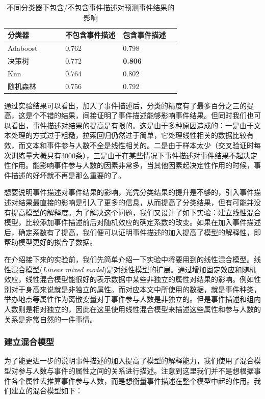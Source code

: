 \documentclass[12pt]{template}
\begin{document}
\begin{table}[htbp] 
  \centering
  \caption{\label{t1-3}不同分类器下包含/不包含事件描述对预测事件结果的影响}
  \begin{tabular*}{\linewidth}{p{0.33\linewidth}p{0.33\linewidth}p{0.33\linewidth}}
\toprule 
分类器&不包含事件描述&包含事件描述\\
\midrule
Adaboost & 0.762 & 0.798 \\
决策树& 0.772 & \textbf{0.806} \\
Knn & 0.764 & 0.802  \\
随机森林 & 0.756 & 0.792 \\
\bottomrule
  \end{tabular*}
\end{table}

通过实验结果可以看出，加入了事件描述后，分类的精度有了最多百分之三的提高，这是个不错的结果，间接证明了事件描述能够影响事件结果。但同时我们也可以看出，事件描述对结果的提高是有限的。这是由于多种原因造成的：一是由于文本处理的方式过于粗糙，拉索回归仍然过于简单，它处理线性相关的数据比较有效，而文本和事件参与人数不全是线性相关的。二是由于样本太少（交叉验证时每次训练量大概只有3000条），三是由于在某些情况下事件描述对事件结果不起决定性作用。能影响事件参与人数的因素非常多，当其他因素起决定性作用的时候，事件描述的好坏就不再是那么重要的了。

想要说明事件描述对事件结果的影响，光凭分类结果的提升是不够的，引入事件描述对结果最直接的影响是引入了更多的信息，从而提高了分类结果，但有可能并没有提高模型的解释度。为了解决这个问题，我们又设计了如下实验：建立线性混合模型，比较添加事件描述前后对随机效应的确定系数的改变。如果在加入事件描述后，确定系数有了提高，我们便可以证明事件描述的加入提高了模型的解释性，即帮助模型更好的拟合了数据。

在介绍接下来的实验前，我们先简单介绍一下实验中将要用到的线性混合模型。线性混合模型(\textit{Linear mixed model})是对线性模型的扩展。通过增加固定效应和随机效应，线性混合模型能很好的表示数据中某些非独立的属性对结果的影响。例如性别对于身高来说就是非独立的属性。而对应本文中所使用的数据，就是事件种类，举办地点等属性作为离散变量对于事件参与人数是非独立的。但是事件描述和组内人数则是相对独立的，因此在这里使用线性混合模型来描述这些属性和参与人数的关系是非常自然的一件事情。

\subsubsection{建立混合模型}

为了能更进一步的说明事件描述的加入提高了模型的解释能力，我们使用了混合模型对参与人数与事件的属性之间的关系进行描述。注意到这里我们并不是想根据事件各个属性去推算事件参与人数，而是想衡量事件描述在整个模型中起的作用。我们建立的混合模型如下：
\end{document}
